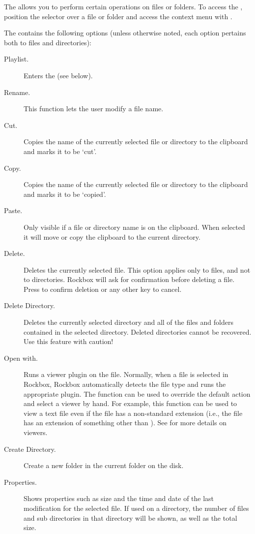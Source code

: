 The  allows you to perform certain operations on files or 
folders.  To access the , position the selector over a file 
or folder and access the context menu with \ActionStdContext{}.


The  contains the following options (unless otherwise noted, 
each option pertains both to files and directories):

\begin{description}
\item [Playlist.]
  Enters the  (see below).
\item [Rename.]
  This function lets the user modify a file name.
\item [Cut.]
  Copies the name of the currently selected file or directory to the clipboard
  and marks it to be `cut'.
\item [Copy.]
  Copies the name of the currently selected file or directory to the clipboard
  and marks it to be `copied'.
\item [Paste.]
  Only visible if a file or directory name is on the clipboard. When selected
  it will move or copy the clipboard to the current directory.
\item [Delete.]
  Deletes the currently selected file. This option applies only to files, and
  not to directories. Rockbox will ask for confirmation before deleting a file.
  Press \ActionYesNoAccept{}
  to confirm deletion or any other key to cancel.
\item [Delete Directory.]
  Deletes the currently selected directory and all of the files and folders
  contained in the selected directory.  Deleted directories cannot be recovered.
  Use this feature with caution!
\item [Open with.]
  Runs a viewer plugin on the file. Normally, when a file is selected in Rockbox,
  Rockbox automatically detects the file type and runs the appropriate plugin.
  The  function can be used to override the default action and
  select a viewer by hand.
  For example, this function can be used to view a text file
  even if the file has a non-standard extension (i.e., the file has an extension
  of something other than ).  See 
  for more details on viewers.
\item [Create Directory.]
  Create a new folder in the current folder on the disk.
\item [Properties.]
  Shows properties such as size and the time and date of the last modification
  for the selected file. If used on a directory, the number of files and sub
  directories in that directory will be shown, as well as the total size.
\end{description}

